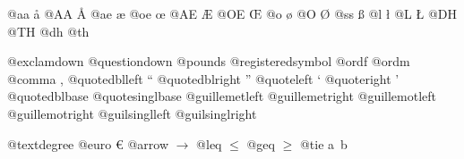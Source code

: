 \documentclass{book}
\begin{document}
\begin{titlepage}
@aa \aa{}
@AA \AA{}
@ae \ae{}
@oe \oe{}
@AE \AE{}
@OE \OE{}
@o \o{}
@O \O{}
@ss \ss{}
@l \l{}
@L \L{}
@DH \DH{}
@TH \TH{}
@dh \dh{}
@th \th{}

@exclamdown \textexclamdown{}
@questiondown \textquestiondown{}
@pounds \textsterling{}
@registeredsymbol \circledR{}
@ordf \textordfeminine{}
@ordm \textordmasculine{}
@comma ,
@quotedblleft \textquotedblleft{}
@quotedblright \textquotedblright{}
@quoteleft \textquoteleft{}
@quoteright \textquoteright{}
@quotedblbase \quotedblbase{}
@quotesinglbase \quotesinglbase{}
@guillemetleft \guillemotleft{}
@guillemetright \guillemotright{}
@guillemotleft \guillemotleft{}
@guillemotright \guillemotright{}
@guilsinglleft \guilsinglleft{}
@guilsinglright \guilsinglright{}

@textdegree \textdegree{}
@euro \euro{}
@arrow $\rightarrow{}$
@leq $\leq{}$
@geq $\geq{}$
@tie a~b


\end{titlepage}
\end{document}
